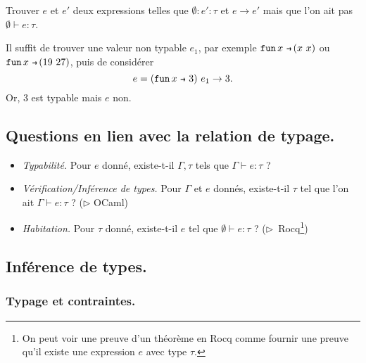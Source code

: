 \documentclass[../main]{subfiles}
\begin{document}
  \begin{exo}
    Trouver $e$ et $e'$ deux expressions telles que $\emptyset : e' : \tau$ et $e \to e'$ mais que l'on ait pas $\emptyset \vdash e : \tau$.
  \end{exo}
  \begin{sol}
    Il suffit de trouver une valeur non typable $e_1$, par exemple $\fun x (x\ x)$ ou  $\fun x (19\ 27)$, puis de considérer \[
      e = (\fun x 3)\ e_1 \to 3
    .\]
    Or, $3$ est typable mais $e$ non.
  \end{sol}

  \subsection{Questions en lien avec la relation de typage.}

  \begin{itemize}
    \item \textit{Typabilité.} Pour $e$ donné, existe-t-il $\Gamma, \tau$ tels que $\Gamma \vdash  e : \tau$ ?
    \item \textit{Vérification/Inférence de types.}
      Pour $\Gamma$ et $e$ donnés, existe-t-il  $\tau$ tel que l'on ait $\Gamma \vdash e : \tau$ ? ($\triangleright$ OCaml)
    \item \textit{Habitation.} Pour $\tau$ donné, existe-t-il  $e$ tel que $\emptyset \vdash e : \tau$ ? ($\triangleright$~Rocq\footnote{On peut voir une preuve d'un théorème en Rocq comme fournir une preuve qu'il existe une expression $e$ avec type $\tau$.}\showfootnote)
  \end{itemize}

  \subsection{Inférence de types.}

  \subsubsection{Typage et contraintes.}
\end{document}
